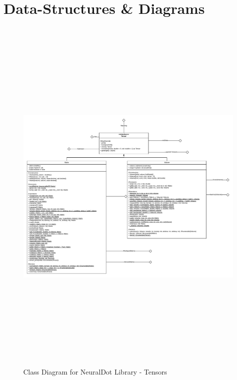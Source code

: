 \section{Data-Structures \& Diagrams}
\begin{figure}[H]
    \centering
    \includegraphics[width=18cm, height=18cm, angle=90]{Design/Overview/UMLCharts/NeuralDotUMLSeperated-Tensor.pdf}
    \caption{Class Diagram for NeuralDot Library - Tensors}
    \label{fig:Class Diagram for NeuralDot Library - Tensors}
\end{figure}

